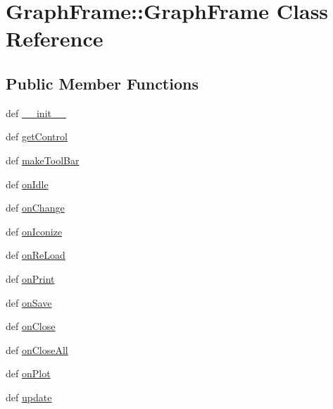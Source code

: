 \hypertarget{classGraphFrame_1_1GraphFrame}{
\section{GraphFrame::GraphFrame Class Reference}
\label{classGraphFrame_1_1GraphFrame}
}
\subsection*{Public Member Functions}
\begin{DoxyCompactItemize}
\item 
def \hyperlink{classGraphFrame_1_1GraphFrame_a55d22ecce4afd645d1358ff0f5e56c66}{\_\-\_\-init\_\-\_\-}
\item 
def \hyperlink{classGraphFrame_1_1GraphFrame_a32e99f5b3802b5a8f1cb92a87b3792fd}{getControl}
\item 
def \hyperlink{classGraphFrame_1_1GraphFrame_af0d04ced9a305bf098ffe9785bd8bfda}{makeToolBar}
\item 
def \hyperlink{classGraphFrame_1_1GraphFrame_adc2631db029ab67454476c812fd1af49}{onIdle}
\item 
def \hyperlink{classGraphFrame_1_1GraphFrame_ac44836eb5e10a1fa2702d1c73d4ae49a}{onChange}
\item 
def \hyperlink{classGraphFrame_1_1GraphFrame_a6d46010ff05f8030489df77bd77230f6}{onIconize}
\item 
def \hyperlink{classGraphFrame_1_1GraphFrame_a278f797694b1612efbed2903606b4bdf}{onReLoad}
\item 
def \hyperlink{classGraphFrame_1_1GraphFrame_ad95e1452b2b81ee03fc3d8f212cb3892}{onPrint}
\item 
def \hyperlink{classGraphFrame_1_1GraphFrame_aa76dca17462ea87055ad4ab8020d3b6d}{onSave}
\item 
def \hyperlink{classGraphFrame_1_1GraphFrame_afc4c4359e1dd987ef93e49c132774401}{onClose}
\item 
def \hyperlink{classGraphFrame_1_1GraphFrame_a8a73c880fceb4359e4f78289f4132c0e}{onCloseAll}
\item 
def \hyperlink{classGraphFrame_1_1GraphFrame_aec9380a98a61e0544580ced8878aec36}{onPlot}
\item 
def \hyperlink{classGraphFrame_1_1GraphFrame_ae950d08eb38967d3c204f9107cbf10f9}{update}
\end{DoxyCompactItemize}
